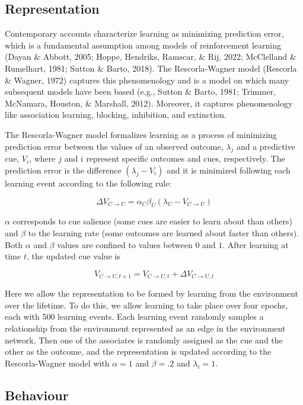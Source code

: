 \documentclass[
  man]{apa6}
\begin{document}
\hypertarget{representation}{%
\subsection{Representation}\label{representation}}

Contemporary accounts characterize learning as minimizing prediction error, which is a fundamental assumption among models of reinforcement learning (Dayan \& Abbott, 2005; Hoppe, Hendriks, Ramscar, \& Rij, 2022; McClelland \& Rumelhart, 1981; Sutton \& Barto, 2018). The Rescorla-Wagner model (Rescorla \& Wagner, 1972) captures this phenomenology and is a model on which many subsequent models have been based (e.g., Sutton \& Barto, 1981; Trimmer, McNamara, Houston, \& Marshall, 2012). Moreover, it captures phenomenology like association learning, blocking, inhibition, and extinction.

The Rescorla-Wagner model formalizes learning as a process of minimizing prediction error between the values of an observed outcome, \(\lambda_j\) and a predictive cue, \(V_i\), where \(j\) and \(i\) represent specific outcomes and cues, respectively. The prediction error is the difference \((\lambda_j-V_i)\) and it is minimized following each learning event according to the following rule:

\[
\Delta V_{C \rightarrow U} = \alpha_C \beta_U (\lambda_{U} - V_{C \rightarrow U})
\]

\(\alpha\) corresponds to cue salience (some cues are easier to learn about than others) and \(\beta\) to the learning rate (some outcomes are learned about faster than others). Both \(\alpha\) and \(\beta\) values are confined to values between \(0\) and \(1\). After learning at time \(t\), the updated cue value is

\[
V_{C \rightarrow U, t+1} = V_{C \rightarrow U, t} + \Delta V_{C \rightarrow U, t}
\]

Here we allow the representation to be formed by learning from the environment over the lifetime. To do this, we allow learning to take place over four epochs, each with 500 learning events. Each learning event randomly samples a relationship from the environment represented as an edge in the environment network. Then one of the associates is randomly assigned as the cue and the other as the outcome, and the representation is updated according to the Rescorla-Wagner model with \(\alpha=1\) and \(\beta=.2\) and \(\lambda_i=1\).

\hypertarget{behaviour}{%
\subsection{Behaviour}\label{behaviour}}
\end{document}
